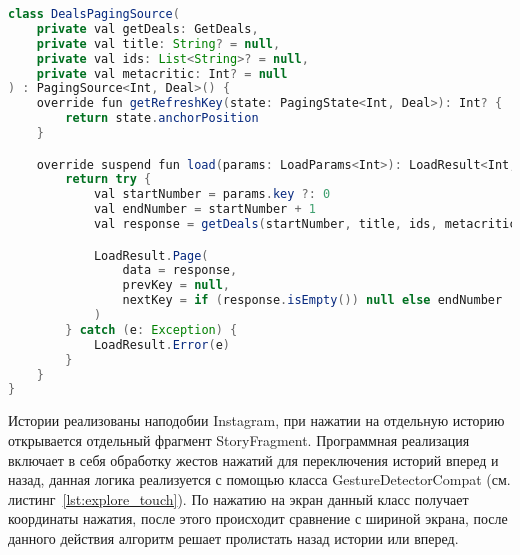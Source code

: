 \begin{lstlisting}[language=Java,label={lst:explore_paging_deals},caption={DealsPagingSource}]
class DealsPagingSource(
    private val getDeals: GetDeals,
    private val title: String? = null,
    private val ids: List<String>? = null,
    private val metacritic: Int? = null
) : PagingSource<Int, Deal>() {
    override fun getRefreshKey(state: PagingState<Int, Deal>): Int? {
        return state.anchorPosition
    }

    override suspend fun load(params: LoadParams<Int>): LoadResult<Int, Deal> {
        return try {
            val startNumber = params.key ?: 0
            val endNumber = startNumber + 1
            val response = getDeals(startNumber, title, ids, metacritic)

            LoadResult.Page(
                data = response,
                prevKey = null,
                nextKey = if (response.isEmpty()) null else endNumber
            )
        } catch (e: Exception) {
            LoadResult.Error(e)
        }
    }
}
\end{lstlisting}

Истории реализованы наподобии Instagram, при нажатии на отдельную историю открывается отдельный фрагмент StoryFragment. Программная реализация включает в себя обработку жестов нажатий для переключения историй вперед и назад, данная логика реализуется с помощью класса GestureDetectorCompat (см. листинг~\ref{lst:explore_touch}). По нажатию на экран данный класс получает координаты нажатия, после этого происходит сравнение с шириной экрана, после данного действия алгоритм решает пролистать назад истории или вперед.


